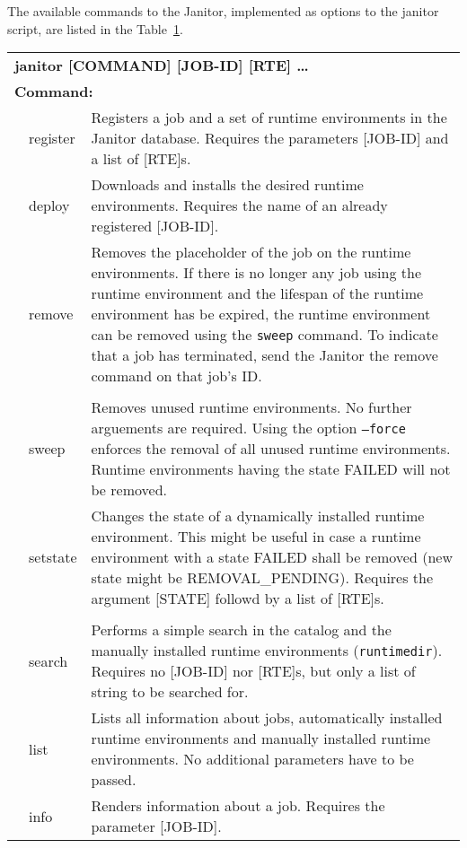 The available commands to the Janitor, implemented as options to the janitor script, are listed
in the Table~\ref{tab:janitor_commandline_man}.
\begin{table}[!h]
   \begin{center}
        \label{tab:janitor_commandline_man}
	\begin{tabular}{p{0.5cm}p{2cm}p{11cm}}
	\multicolumn{3}{l}{\textbf{janitor [COMMAND] [JOB-ID] [RTE] \dots}} \\
	\multicolumn{3}{l}{\textbf{Command:}}\\
	&	register			& Registers a job and a set of runtime environments in the Janitor database. Requires the parameters [JOB-ID] and a list of [RTE]s.\\
	&	deploy				& Downloads and installs the desired runtime environments. Requires the name of an already registered [JOB-ID].\\
	&	remove				& Removes the placeholder of the job on the runtime environments. If there is no longer any job using the runtime environment and the lifespan of the runtime environment has be expired, the runtime environment can be removed using the \texttt{sweep} command. To indicate that a job has terminated, send the Janitor the remove command on that job's ID.\\
	&					&\\
	&	sweep				& Removes unused runtime environments. No further arguements are required. Using the option \texttt{--force} enforces the removal of all unused runtime environments. Runtime environments having the state FAILED will not be removed.\\
	&	setstate			& Changes the state of a dynamically installed runtime environment. This might be useful in case a runtime environment with a state FAILED shall be removed (new state might be REMOVAL\_PENDING). Requires the argument [STATE] followd by a list of [RTE]s.\\
	&					&\\
	&	search				& Performs a simple search in the catalog and the manually installed runtime environments (\texttt{runtimedir}). Requires no [JOB-ID] nor [RTE]s, but only a list of string to be searched for.\\
	&	list				& Lists all information about jobs, automatically installed runtime environments and manually installed runtime environments. No additional parameters have to be passed.\\
	&	info				& Renders information about a job. Requires the parameter [JOB-ID].\\

\end{tabular}
\end{center}
\end{table}
